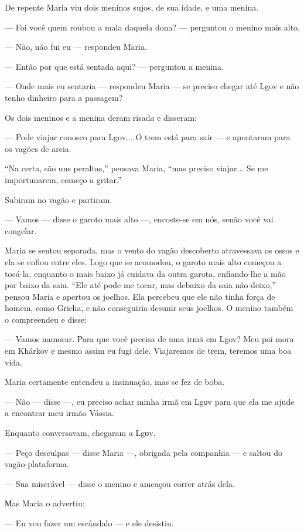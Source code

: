 De repente Maria viu dois meninos sujos, de sua idade, e uma menina.

--- Foi você quem roubou a mala daquela dona? --- perguntou o menino
mais alto.

--- Não, não fui eu --- respondeu Maria.

--- Então por que está sentada aqui? --- perguntou a menina.

--- Onde mais eu sentaria --- respondeu Maria --- se preciso chegar até
Lgov e não tenho dinheiro para a passagem?

Os dois meninos e a menina deram risada e disseram:

--- Pode viajar conosco para Lgov... O trem está para sair --- e
apontaram para os vagões de areia.

``Na certa, são uns peraltas,'' pensava Maria, ``mas preciso viajar...
Se me importunarem, começo a gritar.''

Subiram no vagão e partiram.

--- Vamos --- disse o garoto mais alto ---, encoste-se em nós, senão
você vai congelar.

Maria se sentou separada, mas o vento do vagão descoberto atravessava os
ossos e ela se enfiou entre eles. Logo que se acomodou, o garoto mais
alto começou a tocá-la, enquanto o mais baixo já cuidava da outra
garota, enfiando-lhe a mão por baixo da saia. ``Ele até pode me tocar,
mas debaixo da saia não deixo,'' pensou Maria e apertou os joelhos. Ela
percebeu que ele não tinha força de homem, como Gricha, e não
conseguiria desunir seus joelhos. O menino também o compreendeu e disse:

--- Vamos namorar. Para que você precisa de uma irmã em Lgov? Meu pai
mora em Khárkov e mesmo assim eu fugi dele. Viajaremos de trem, teremos
uma boa vida.

Maria certamente entendeu a insinuação, mas se fez de boba.

--- Não --- disse ---, eu preciso achar minha irmã em Lgоv para que ela
me ajude a encontrar meu irmão Vássia.

Enquanto conversavam, chegaram a Lgоv.

--- Peço desculpas --- disse Maria ---, obrigada pela companhia --- e
saltou do vagão-plataforma.

--- Sua miserável --- disse o menino e ameaçou correr atrás dela.

Мas Maria o advertiu:

--- Eu vou fazer um escândalo --- e ele desistiu.

